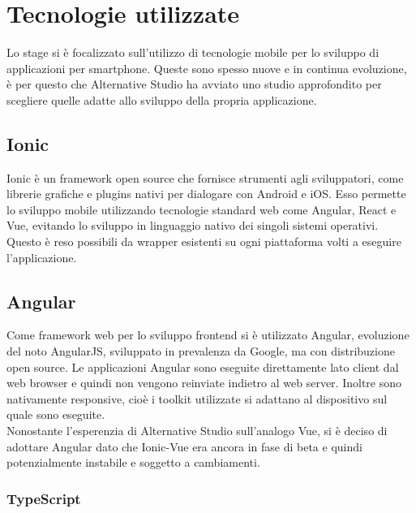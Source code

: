 
\section{Tecnologie utilizzate}

Lo stage si è focalizzato sull'utilizzo di tecnologie mobile per lo sviluppo di applicazioni per smartphone. Queste sono spesso nuove e in continua evoluzione, è per questo che Alternative Studio ha avviato uno studio approfondito per scegliere quelle adatte allo sviluppo della propria applicazione.

\subsection{Ionic}

\gls{Ionic} è un \gls{framework} open source che fornisce strumenti agli sviluppatori, come librerie grafiche e plugins nativi per dialogare con \gls{Android} e \gls{iOS}. Esso permette lo sviluppo mobile utilizzando tecnologie standard web come Angular, React e Vue, evitando lo sviluppo in linguaggio nativo dei singoli sistemi operativi.
Questo è reso possibili da wrapper esistenti su ogni piattaforma volti a eseguire l'applicazione.

\subsection{Angular}

Come framework web per lo sviluppo \gls{frontend} si è utilizzato Angular, evoluzione del noto AngularJS, sviluppato in prevalenza da Google, ma con distribuzione \gls{open source}. Le applicazioni Angular sono eseguite direttamente lato client dal web browser e quindi non vengono reinviate indietro al web server. Inoltre sono nativamente responsive, cioè i toolkit utilizzate si adattano al dispositivo sul quale sono eseguite. \\
Nonostante l'esperenzia di Alternative Studio sull'analogo Vue, si è deciso di adottare Angular dato che Ionic-Vue era ancora in fase di beta e quindi potenzialmente instabile e soggetto a cambiamenti.

\subsubsection{TypeScript}

